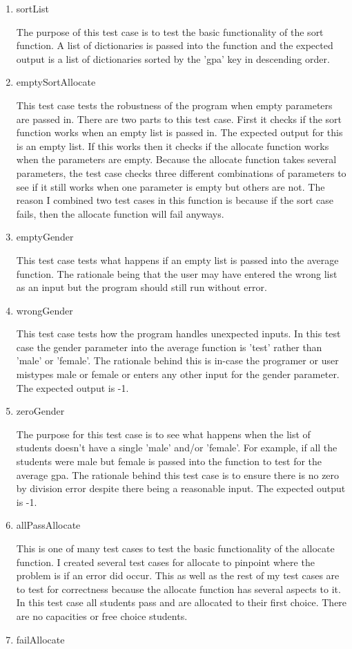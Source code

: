 \documentclass[12pt]{article}
\begin{document}
\begin{enumerate}
   \item sortList

The purpose of this test case is to test the basic functionality of the sort function. A list of dictionaries is passed into the function and the expected output is a list of dictionaries sorted by the 'gpa' key in descending order.
   \item emptySortAllocate

This test case tests the robustness of the program when empty parameters are passed in. There are two parts to this test case. First it checks if the sort function works when an empty list is passed in. The expected output for this is an empty list. If this works then it checks if the allocate function works when the parameters are empty. Because the allocate function takes several parameters, the test case checks three different combinations of parameters to see if it still works when one parameter is empty but others are not. The reason I combined two test cases in this function is because if the sort case fails, then the allocate function will fail anyways.  
   \item emptyGender

This test case tests what happens if an empty list is passed into the average function. The rationale being that the user may have entered the wrong list as an input but the program should still run without error.
   \item wrongGender

This test case tests how the program handles unexpected inputs. In this test case the gender parameter into the average function is 'test' rather than 'male' or 'female'. The rationale behind this is in-case the programer or user mistypes male or female or enters any other input for the gender parameter. The expected output is -1.
   \item zeroGender

The purpose for this test case is to see what happens when the list of students doesn't have a single 'male' and/or 'female'. For example, if all the students were male but female is passed into the function to test for the average gpa. The rationale behind this test case is to ensure there is no zero by division error despite there being a reasonable input. The expected output is -1.
   \item allPassAllocate

This is one of many test cases to test the basic functionality of the allocate function. I created several test cases for allocate to pinpoint where the problem is if an error did occur. This as well as the rest of my test cases are to test for correctness because the allocate function has several aspects to it. In this test case all students pass and are allocated to their first choice. There are no capacities or free choice students.
   \item failAllocate


\end{enumerate}
\end{document}
